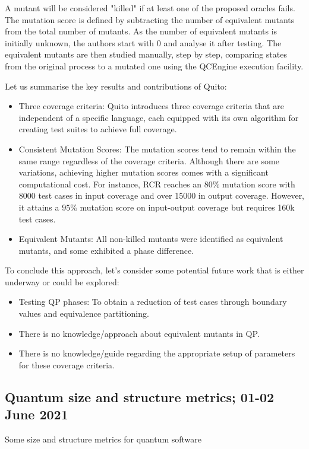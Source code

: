 \begin{itemize}
A mutant will be considered "killed" if at least one of the proposed oracles fails. The mutation score is defined by subtracting the number of equivalent mutants from the total number of mutants. As the number of equivalent mutants is initially unknown, the authors start with 0 and analyse it after testing. The equivalent mutants are then studied manually, step by step, comparing states from the original process to a mutated one using the QCEngine execution facility.\newline

Let us summarise the key results and contributions of Quito:
\begin{itemize}
    \item Three coverage criteria: Quito introduces three coverage criteria that are independent of a specific language, each equipped with its own algorithm for creating test suites to achieve full coverage.
    \item Consistent Mutation Scores: The mutation scores tend to remain within the same range regardless of the coverage criteria. Although there are some variations, achieving higher mutation scores comes with a significant computational cost. For instance, RCR reaches an $80\%$ mutation score with 8000 test cases in input coverage and over 15000 in output coverage. However, it attains a $95\%$ mutation score on input-output coverage but requires 160k test cases.
    \item Equivalent Mutants: All non-killed mutants were identified as equivalent mutants, and some exhibited a phase difference.
\end{itemize}

To conclude this approach, let's consider some potential future work that is either underway or could be explored:

\begin{itemize}
    \item Testing QP phases: To obtain a reduction of test cases through boundary values and equivalence partitioning.
    \item There is no knowledge/approach about equivalent mutants in QP.
    \item There is no knowledge/guide regarding the appropriate setup of parameters for these coverage criteria.
\end{itemize}

\vspace{15pt}
\subsection{Quantum size and structure metrics; 01-02 June 2021}
Some size and structure metrics for quantum software\cite{zhao2021some}


\end{itemize}
